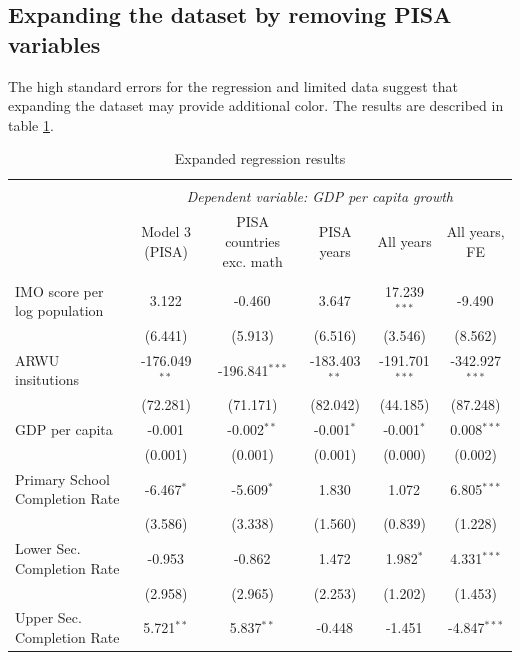 \documentclass[11pt]{article}
\begin{document}
\subsection{Expanding the dataset by removing PISA variables}
The high standard errors for the regression and limited data suggest that expanding the dataset may provide additional color.
The results are described in table \ref{table:expanded}.
\begin{table}[H] \centering
    \caption{Expanded regression results}
    \label{table:expanded}
    \resizebox{\linewidth}{!} {
    \begin{tabular}{@{\extracolsep{5pt}}lccccc}
    \\[-1.8ex]\hline
    \hline \\[-1.8ex]
    & \multicolumn{5}{c}{\textit{Dependent variable: GDP per capita growth}} \
    \cr \cline{2-6}
    \\[-1.8ex] & \multicolumn{1}{c}{Model 3 (PISA)} & \multicolumn{1}{c}{PISA countries exc. math} & \multicolumn{1}{c}{PISA years} & \multicolumn{1}{c}{All years} & \multicolumn{1}{c}{All years, FE}  \\
    \hline \\[-1.8ex]
    IMO score per log population & 3.122$^{}$ & -0.460$^{}$ & 3.647$^{}$ & 17.239$^{***}$ & -9.490$^{}$ \\
    & (6.441) & (5.913) & (6.516) & (3.546) & (8.562) \\
    ARWU insitutions & -176.049$^{**}$ & -196.841$^{***}$ & -183.403$^{**}$ & -191.701$^{***}$ & -342.927$^{***}$ \\
    & (72.281) & (71.171) & (82.042) & (44.185) & (87.248) \\
    GDP per capita & -0.001$^{}$ & -0.002$^{**}$ & -0.001$^{*}$ & -0.001$^{*}$ & 0.008$^{***}$ \\
    & (0.001) & (0.001) & (0.001) & (0.000) & (0.002) \\
    Primary School Completion Rate & -6.467$^{*}$ & -5.609$^{*}$ & 1.830$^{}$ & 1.072$^{}$ & 6.805$^{***}$ \\
    & (3.586) & (3.338) & (1.560) & (0.839) & (1.228) \\
    Lower Sec. Completion Rate & -0.953$^{}$ & -0.862$^{}$ & 1.472$^{}$ & 1.982$^{*}$ & 4.331$^{***}$ \\
    & (2.958) & (2.965) & (2.253) & (1.202) & (1.453) \\
    Upper Sec. Completion Rate & 5.721$^{**}$ & 5.837$^{**}$ & -0.448$^{}$ & -1.451$^{}$ & -4.847$^{***}$ \\

\end{tabular}}
\end{table}
\end{document}
